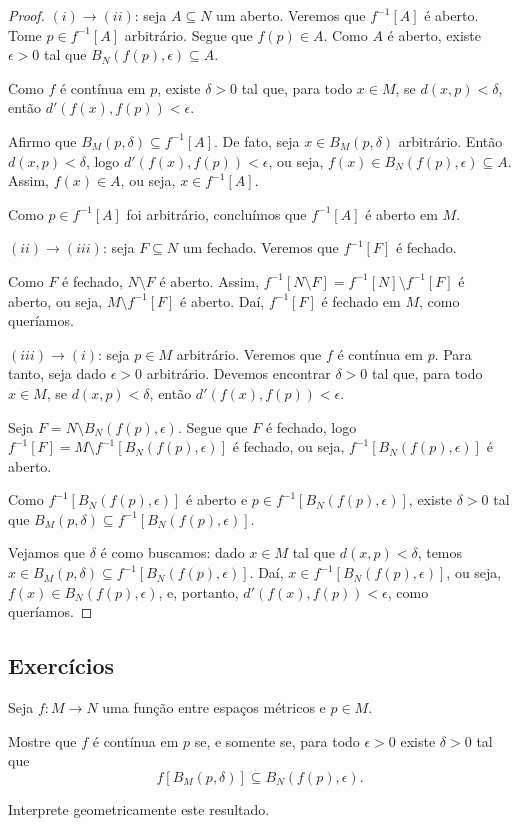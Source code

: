 \begin{proof}
    $(i)\rightarrow (ii)$: seja $A\subseteq N$ um aberto.
    Veremos que $f^{-1}[A]$ é aberto.
    Tome $p \in f^{-1}[A]$ arbitrário.
    Segue que $f(p) \in A$.
    Como $A$ é aberto, existe $\epsilon>0$ tal que $B_N(f(p), \epsilon)\subseteq A$.

    Como $f$ é contínua em $p$, existe $\delta>0$ tal que, para todo $x \in M$, se $d(x, p) < \delta$, então $d'(f(x), f(p)) < \epsilon$.

    Afirmo que $B_M(p, \delta)\subseteq f^{-1}[A]$.
    De fato, seja $x \in B_M(p, \delta)$ arbitrário.
    Então $d(x, p) < \delta$, logo $d'(f(x), f(p)) < \epsilon$, ou seja, $f(x) \in B_N(f(p), \epsilon)\subseteq A$.
    Assim, $f(x)\in A$, ou seja, $x \in f^{-1}[A]$.

    Como $p \in f^{-1}[A]$ foi arbitrário, concluímos que $f^{-1}[A]$ é aberto em $M$.

    $(ii)\rightarrow (iii)$: seja $F\subseteq N$ um fechado.
    Veremos que $f^{-1}[F]$ é fechado.

    Como $F$ é fechado, $N\setminus F$ é aberto.
    Assim, $f^{-1}[N\setminus F]=f^{-1}[N]\setminus f^{-1}[F]$ é aberto, ou seja, $M\setminus f^{-1}[F]$ é aberto.
    Daí, $f^{-1}[F]$ é fechado em $M$, como queríamos.

    $(iii)\rightarrow (i)$: seja $p \in M$ arbitrário.
    Veremos que $f$ é contínua em $p$.
    Para tanto, seja dado $\epsilon>0$ arbitrário.
    Devemos encontrar $\delta>0$ tal que, para todo $x \in M$, se $d(x, p) < \delta$, então $d'(f(x), f(p)) < \epsilon$.

    Seja $F = N\setminus B_N(f(p), \epsilon)$.
    Segue que $F$ é fechado, logo $f^{-1}[F]=M\setminus f^{-1}[B_N(f(p), \epsilon)]$ é fechado, ou seja, $f^{-1}[B_N(f(p), \epsilon)]$ é aberto.

    Como $f^{-1}[B_N(f(p), \epsilon)]$ é aberto e $p\in f^{-1}[B_N(f(p), \epsilon)]$, existe $\delta>0$ tal que $B_M(p, \delta)\subseteq f^{-1}[B_N(f(p), \epsilon)]$.

    Vejamos que $\delta$ é como buscamos: dado $x\in M$ tal que $d(x, p) < \delta$, temos $x \in B_M(p, \delta)\subseteq f^{-1}[B_N(f(p), \epsilon)]$.
    Daí, $x \in f^{-1}[B_N(f(p), \epsilon)]$, ou seja, $f(x) \in B_N(f(p), \epsilon)$, e, portanto, $d'(f(x), f(p)) < \epsilon$, como queríamos.
\end{proof}

\subsection*{Exercícios}
\begin{exercise}
    Seja $f:M\rightarrow N$ uma função entre espaços métricos e $p \in M$.

    Mostre que $f$ é contínua em $p$ se, e somente se, para todo $\epsilon>0$ existe $\delta>0$ tal que
    \[
        f\left[B_M(p, \delta)\right]\subseteq B_N(f(p), \epsilon).
    \]
    
    Interprete geometricamente este resultado.
\end{exercise}
